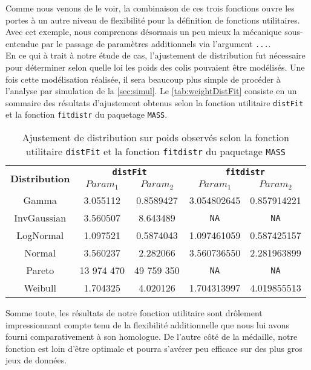 Comme nous venons de le voir, la combinaison de ces trois fonctions ouvre les portes à un autre niveau de flexibilité pour la définition de fonctions utilitaires. Avec cet exemple, nous comprenons désormais un peu mieux la mécanique sous-entendue par le passage de paramètres additionnels via l'argument \texttt{...}. \\

En ce qui à trait à notre étude de cas, l'ajustement de distribution fut nécessaire pour déterminer selon quelle loi les poids des colis pouvaient être modélisés. Une fois cette modélisation réalisée, il sera beaucoup plus simple de procéder à l'analyse par simulation de la \autoref{sec:simul}. Le \autoref{tab:weightDistFit} consiste en un sommaire des résultats d'ajustement obtenus selon la fonction utilitaire \texttt{distFit} et la fonction \texttt{fitdistr} du paquetage \texttt{MASS}. \\

\begin{table}
	\centering
	\begin{tabular}{ccccc}
		\multirow{2}{*}{\textbf{Distribution}} & \multicolumn{2}{c}{\textbf{\texttt{distFit}}} & \multicolumn{2}{c}{\textbf{\texttt{fitdistr}}} \\
		& \textbf{$Param_1$} & \textbf{$Param_2$} & \textbf{$Param_1$} & \textbf{$Param_2$} \\
		\hline
		Gamma & 3.055112 & 0.8589427 & 3.054802645 & 0.857914221 \\
		InvGaussian & 3.560507 & 8.643489 & \texttt{NA} & \texttt{NA} \\
		LogNormal & 1.097521 & 0.5874043 & 1.097461059 & 0.587425157 \\
		Normal & 3.560237 & 2.282066 & 3.560736550 & 2.281963899 \\
		Pareto & 13 974 470 & 49 759 350 & \texttt{NA} & \texttt{NA} \\
		Weibull & 1.704325 & 4.020126 & 1.704313997 & 4.019855513 \\	
	\end{tabular}
	\caption{Ajustement de distribution sur poids observés selon la fonction utilitaire \texttt{distFit} et la fonction \texttt{fitdistr} du paquetage \texttt{MASS}}
	\label{tab:weightDistFit}
\end{table} 


Somme toute, les résultats de notre fonction utilitaire sont drôlement impressionnant compte tenu de la flexibilité additionnelle que nous lui avons fourni comparativement à son homologue. De l'autre côté de la médaille, notre fonction est loin d'être optimale et pourra s'avérer peu efficace sur des plus gros jeux de données. \\

